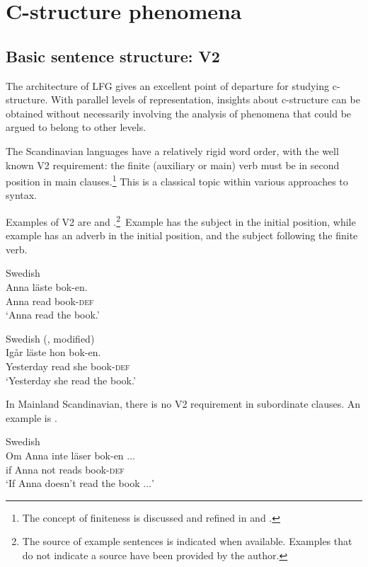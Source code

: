 \documentclass[output=paper,hidelinks]{langscibook}
\begin{document}
\section{C-structure phenomena}

\subsection{Basic sentence structure: V2}

The architecture of LFG gives an excellent point of departure for studying c-structure. With parallel levels of representation, insights about c-structure can be obtained without necessarily involving the analysis of phenomena that could be argued to belong to other levels.

 The Scandinavian languages have a relatively rigid word order, with the well known V2 requirement: the finite (auxiliary or main) verb must be in second position in main clauses.\footnote{The concept of finiteness is discussed and refined in \citet{Sells07} and \citet{Heinat12}.} This is a classical topic within various approaches to syntax.

 Examples of V2 are  and .\footnote{The source of example sentences is indicated when available. Examples that do not indicate a source have been provided by the author.}\ Example  has the subject in the initial position, while example  has an adverb in the initial position, and the subject following the finite verb.


\ea\label{ex:Scandinavian:1} Swedish \citep[34]{sellssao}\\
 \gll
 {Anna} {läste} {bok-en.}\\
 Anna read book-\textsc{def}\\
\glt `Anna read the book.'
\z

\newpage
\ea\label{ex:Scandinavian:2} Swedish (\citealt[34]{sellssao}, modified)\\
\gll
 {Igår} {läste} {hon} {bok-en.}\\
 Yesterday read she book-\textsc{def}\\
 \glt `Yesterday she read the book.'
 \z

\noindent In Mainland Scandinavian, there is no V2 requirement in subordinate clauses. An example is .



\ea\label{ex:Scandinavian:3} Swedish\\
\gll
 {Om} {Anna} {inte} {läser} {bok-en} $\ldots$\\
 if Anna not reads book-\textsc{def}\\
 \glt `If Anna doesn't read the book $\ldots$'
 \z
\end{document}
